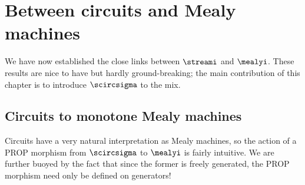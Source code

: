 \section{Between circuits and Mealy machines}

We have now established the close links between \(\streami\) and \(\mealyi\).
These results are nice to have but hardly ground-breaking; the main contribution
of this chapter is to introduce \(\scircsigma\) to the mix.

\subsection{Circuits to monotone Mealy machines}

Circuits have a very natural interpretation as Mealy machines, so the action
of a PROP morphism from \(\scircsigma\) to \(\mealyi\) is fairly intuitive.
We are further buoyed by the fact that since the former is freely generated, the
PROP morphism need only be defined on generators!

